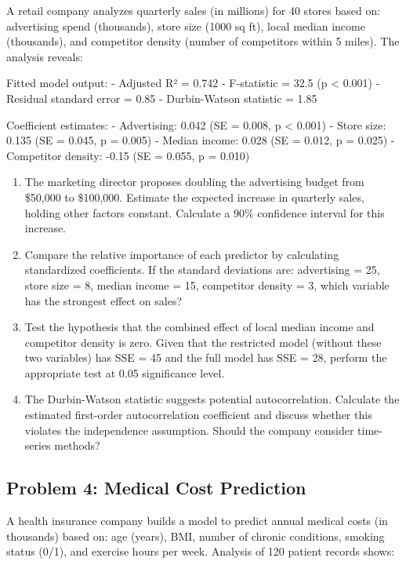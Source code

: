 \documentclass[12pt]{article}
\begin{document}
A retail company analyzes quarterly sales (in millions) for 40 stores based on: advertising spend (thousands), store size (1000 sq ft), local median income (thousands), and competitor density (number of competitors within 5 miles). The analysis reveals:

Fitted model output:
- Adjusted R² = 0.742
- F-statistic = 32.5 (p < 0.001)
- Residual standard error = 0.85
- Durbin-Watson statistic = 1.85

Coefficient estimates:
- Advertising: 0.042 (SE = 0.008, p < 0.001)
- Store size: 0.135 (SE = 0.045, p = 0.005)
- Median income: 0.028 (SE = 0.012, p = 0.025)
- Competitor density: -0.15 (SE = 0.055, p = 0.010)

\begin{enumerate}[label=(\alph*)]
\item The marketing director proposes doubling the advertising budget from \$50,000 to \$100,000. Estimate the expected increase in quarterly sales, holding other factors constant. Calculate a 90\% confidence interval for this increase.

\item Compare the relative importance of each predictor by calculating standardized coefficients. If the standard deviations are: advertising = 25, store size = 8, median income = 15, competitor density = 3, which variable has the strongest effect on sales?

\item Test the hypothesis that the combined effect of local median income and competitor density is zero. Given that the restricted model (without these two variables) has SSE = 45 and the full model has SSE = 28, perform the appropriate test at 0.05 significance level.

\item The Durbin-Watson statistic suggests potential autocorrelation. Calculate the estimated first-order autocorrelation coefficient and discuss whether this violates the independence assumption. Should the company consider time-series methods?
\end{enumerate}

\subsection*{Problem 4: Medical Cost Prediction}

A health insurance company builds a model to predict annual medical costs (in thousands) based on: age (years), BMI, number of chronic conditions, smoking status (0/1), and exercise hours per week. Analysis of 120 patient records shows:
\end{document}
